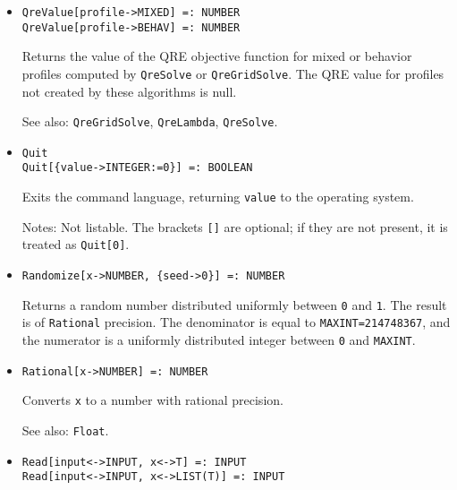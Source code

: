 \begin{itemize}
\item{}
\protect \large \begin{verbatim}
QreValue[profile->MIXED] =: NUMBER 
QreValue[profile->BEHAV] =: NUMBER 
\end{verbatim}\normalsize

\bd
Returns the value of the QRE objective function for mixed or behavior
profiles computed by \verb+QreSolve+ or \verb+QreGridSolve+.  The QRE
value for profiles not created by these algorithms is null.
\item
[See also:] \verb+QreGridSolve+, \verb+QreLambda+, \verb+QreSolve+.
\ed

\item{}
\protect \large \begin{verbatim}
Quit
Quit[{value->INTEGER:=0}] =: BOOLEAN
\end{verbatim}\normalsize

\bd
Exits the command language, returning \verb+value+ to the operating system.
\item [Notes:] Not listable.  The brackets \verb+[]+ are optional; if they
are not present, it is treated as \verb+Quit[0]+.
\ed


\item{}
\protect \large \begin{verbatim}
Randomize[x->NUMBER, {seed->0}] =: NUMBER
\end{verbatim}\normalsize

\bd 
Returns a random number distributed uniformly between \verb+0+ and
\verb+1+.  The result is of \verb+Rational+ precision.  The
denominator is equal to \verb+MAXINT=214748367+, and the numerator is
a uniformly distributed integer between \verb+0+ and \verb+MAXINT+.
\ed

\item{}
\protect \large \begin{verbatim}
Rational[x->NUMBER] =: NUMBER
\end{verbatim}\normalsize

\bd
Converts \verb+x+ to a number with rational precision.
\item [See also:] \verb+Float+.
\ed

\item{}
\protect \large \begin{verbatim}
Read[input<->INPUT, x<->T] =: INPUT 
Read[input<->INPUT, x<->LIST(T)] =: INPUT
\end{verbatim}\normalsize


\end{itemize}
